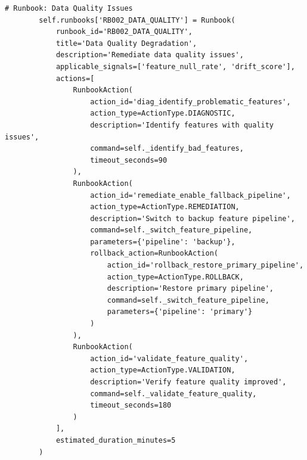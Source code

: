 \begin{lstlisting}[style=python, caption={Runbook automation with guided remediation}]
        # Runbook: Data Quality Issues
        self.runbooks['RB002_DATA_QUALITY'] = Runbook(
            runbook_id='RB002_DATA_QUALITY',
            title='Data Quality Degradation',
            description='Remediate data quality issues',
            applicable_signals=['feature_null_rate', 'drift_score'],
            actions=[
                RunbookAction(
                    action_id='diag_identify_problematic_features',
                    action_type=ActionType.DIAGNOSTIC,
                    description='Identify features with quality issues',
                    command=self._identify_bad_features,
                    timeout_seconds=90
                ),
                RunbookAction(
                    action_id='remediate_enable_fallback_pipeline',
                    action_type=ActionType.REMEDIATION,
                    description='Switch to backup feature pipeline',
                    command=self._switch_feature_pipeline,
                    parameters={'pipeline': 'backup'},
                    rollback_action=RunbookAction(
                        action_id='rollback_restore_primary_pipeline',
                        action_type=ActionType.ROLLBACK,
                        description='Restore primary pipeline',
                        command=self._switch_feature_pipeline,
                        parameters={'pipeline': 'primary'}
                    )
                ),
                RunbookAction(
                    action_id='validate_feature_quality',
                    action_type=ActionType.VALIDATION,
                    description='Verify feature quality improved',
                    command=self._validate_feature_quality,
                    timeout_seconds=180
                )
            ],
            estimated_duration_minutes=5
        )


\end{lstlisting}
